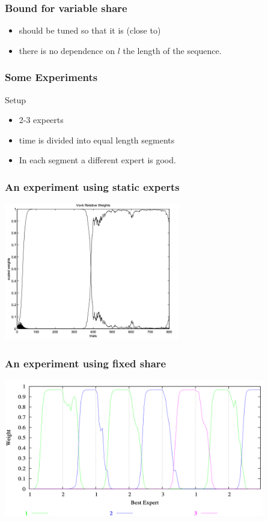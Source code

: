 \documentclass[handout]{beamer}
\begin{document}
\begin{small}
\begin{frame}
\frametitle{Bound for variable share}
\pause
\begin{itemize}
\item \R{$\alpha$} should be tuned so that it is (close to) 
  \item there is no dependence on $l$ the length of the sequence.
\end{itemize}
\end{frame}

\begin{frame}
  \frametitle{Some Experiments}
  Setup
  \begin{itemize}
  \item 2-3 expeerts
  \item time is divided into equal length segments
  \item In each segment a different expert is good.
  \end{itemize}
\end{frame}

\begin{frame}
\frametitle{An experiment using static experts}
\includegraphics[height=6cm]{figures/NoShare.png}
\end{frame}

\begin{frame}
\frametitle{An experiment using fixed share}
\includegraphics[height=6cm]{figures/FixedShareFigure.png}
\end{frame}


\end{small}
\end{document}
